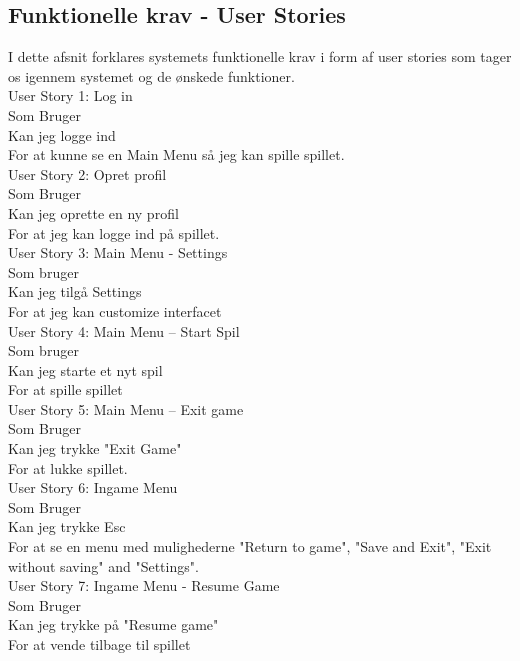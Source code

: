 \subsection{Funktionelle krav - User Stories}
I dette afsnit forklares systemets funktionelle krav i form af user stories som tager os igennem systemet og de ønskede funktioner. \\
 
User Story 1: Log in \\
  Som Bruger \\
  Kan jeg logge ind \\
  For at kunne se en Main Menu så jeg kan spille spillet. \\
  
User Story 2: Opret profil \\
  Som Bruger \\
  Kan jeg oprette en ny profil \\
  For at jeg kan logge ind på spillet. \\

User Story 3: Main Menu - Settings \\
  Som bruger \\
  Kan jeg tilgå Settings \\
  For at jeg kan customize interfacet \\

User Story 4: Main Menu -- Start Spil \\
  Som bruger \\
  Kan jeg starte et nyt spil \\ 
  For at spille spillet \\
  
User Story 5: Main Menu -- Exit game \\
  Som Bruger \\ 
  Kan jeg trykke "Exit Game" \\
  For at lukke spillet. \\

User Story 6: Ingame Menu \\
  Som Bruger \\ 
  Kan jeg trykke Esc \\
  For at se en menu med mulighederne "Return to game", "Save and Exit", "Exit without saving" and "Settings". \\

User Story 7: Ingame Menu - Resume Game\\
  Som Bruger \\
  Kan jeg trykke på "Resume game" \\
  For at vende tilbage til spillet\\

